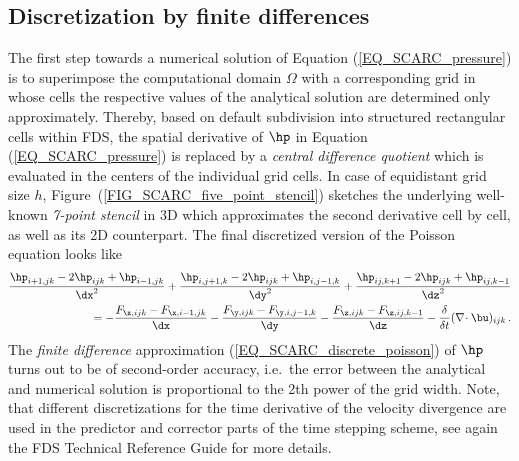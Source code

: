 \subsection{Discretization by finite differences}
\label{SEC_SCARC_discretization_poisson}

The first step towards a numerical solution of Equation (\ref{EQ_SCARC_pressure}) is to superimpose the computational domain $\Omega$ with a corresponding grid in whose cells the respective values of the analytical solution are determined only approximately. 
Thereby, based on default subdivision into structured rectangular cells within FDS,
the spatial derivative of $\hp$ in Equation (\ref{EQ_SCARC_pressure}) is replaced by a 
{\it central difference quotient} which is evaluated in the centers of the individual grid cells.  In case of equidistant grid size $h$, %
Figure~(\ref{FIG_SCARC_five_point_stencil}) sketches the underlying well-known {\it 7-point stencil} in 3D which approximates the second derivative cell by cell, as well as its 2D counterpart.
%
The final discretized version of the Poisson equation looks like
\small
\begin{align}
\frac{\hp_{i+1,jk}-2\hp_{ijk}+\hp_{i-1,jk}}{\dx^2} +
\frac{\hp_{i,j+1,k}-2\hp_{ijk}+\hp_{i,j-1,k}}{\dy^2} +
\frac{\hp_{ij,k+1}-2\hp_{ijk}+\hp_{ij,k-1}}{\dz^2} \notag \\ =
    -\frac{F_{\x,ijk} - F_{\x,i-1,jk}}{\dx}
    -\frac{F_{\y,ijk} - F_{\y,i,j-1,k}}{\dy}
    -\frac{F_{\z,ijk} - F_{\z,ij,k-1}}{\dz} - \frac{\delta}{\delta t}(\nabla\!\cdot \bu)_{ijk}\,.
\label{EQ_SCARC_discrete_poisson}
\end{align}
\normalsize
The {\it finite difference} approximation (\ref{EQ_SCARC_discrete_poisson})
of $\hp$ turns out to be of second-order accuracy, i.e.\ the error between the analytical and numerical solution is proportional to the 2th power of the grid width.
Note, that different discretizations for the time derivative of the velocity divergence are used in the predictor and corrector parts of the time stepping scheme, see again the FDS Technical Reference Guide\cite{McGrattan:2018:TG} for more details. 

